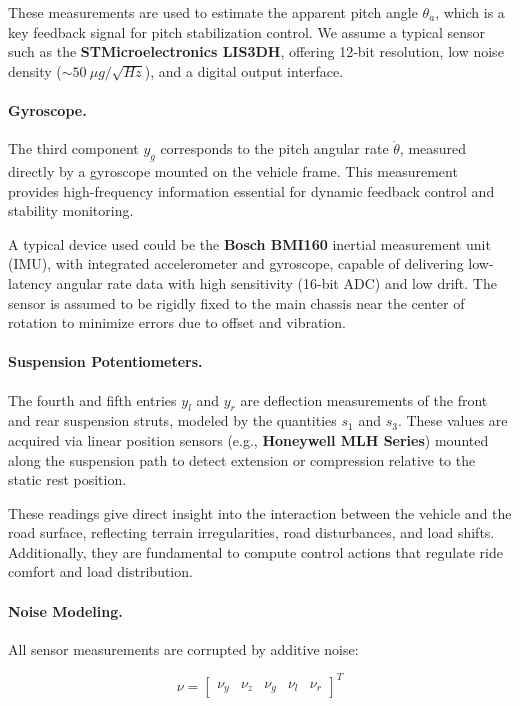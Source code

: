 \documentclass[]{report}
\begin{document}
These measurements are used to estimate the apparent pitch angle $\theta_a$, which is a key feedback signal for pitch stabilization control. We assume a typical sensor such as the \textbf{STMicroelectronics LIS3DH}, offering 12-bit resolution, low noise density ($\sim50~\mu g/\sqrt{Hz}$), and a digital output interface.

\paragraph{Gyroscope.}
The third component $y_g$ corresponds to the pitch angular rate $\dot{\theta}$, measured directly by a gyroscope mounted on the vehicle frame. This measurement provides high-frequency information essential for dynamic feedback control and stability monitoring.

A typical device used could be the \textbf{Bosch BMI160} inertial measurement unit (IMU), with integrated accelerometer and gyroscope, capable of delivering low-latency angular rate data with high sensitivity (16-bit ADC) and low drift. The sensor is assumed to be rigidly fixed to the main chassis near the center of rotation to minimize errors due to offset and vibration.

\paragraph{Suspension Potentiometers.}
The fourth and fifth entries $y_l$ and $y_r$ are deflection measurements of the front and rear suspension struts, modeled by the quantities $s_1$ and $s_3$. These values are acquired via linear position sensors (e.g., \textbf{Honeywell MLH Series}) mounted along the suspension path to detect extension or compression relative to the static rest position.

These readings give direct insight into the interaction between the vehicle and the road surface, reflecting terrain irregularities, road disturbances, and load shifts. Additionally, they are fundamental to compute control actions that regulate ride comfort and load distribution.

\paragraph{Noise Modeling.}
All sensor measurements are corrupted by additive noise:

\[
\nu = \begin{bmatrix}
	\nu_y & \nu_z & \nu_g & \nu_l & \nu_r
\end{bmatrix}^T
\]
\end{document}
